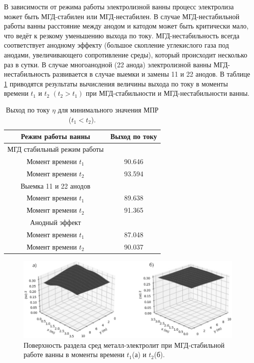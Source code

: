 \documentclass[]{pmi}
\begin{document}
В зависимости от режима работы электролизной ванны процесс электролиза может быть МГД-стабилен или МГД-нестабилен. В случае МГД-нестабильной работы ванны расстояние между анодом и катодом может быть критически мало, что ведёт к резкому уменьшению выхода по току. МГД-нестабильность всегда соответствует анодному эффекту (большое скопление углекислого газа под анодами, увеличивающего сопротивление среды), который происходит несколько раз в сутки. В случае многоанодной (22 анода) электролизной ванны МГД-нестабильность развивается в случае выемки и замены 11 и 22 анодов. В таблице \ref{table:vihPoToku} приводятся результаты вычисления величины выхода по току в моменты времени $t_1$ и $t_2$ $(t_2>t_1)$ при МГД-стабильности и МГД-нестабильности ванны. 

\begin{table}[H]
\centering
\begin{tabular}{|c|c|}
\hline
Режим работы ванны &Выход по току	\\
\hline
МГД стабильный режим работы &	\\
Момент времени $t_1$			&90.646	\\ 
Момент времени $t_2$		&93.594	\\  
\hline
Выемка 11 и 22 анодов &	\\
Момент времени $t_1$		&89.638	\\  
Момент времени $t_2$		&91.365	\\  
\hline
Анодный эффект &	\\
Момент времени $t_1$	&87.048	\\  
Момент времени $t_2$	&90.037	\\  
\hline
\end{tabular}
\caption{Выход по току $\eta$ для минимального значения МПР ($t_1 < t_2$). \label{table:vihPoToku}}
\end{table}

\begin{figure}[H]
    \centering
    \includegraphics[width=150mm]{спокойная поверхность.png}
    \caption{Поверхность раздела сред металл-электролит при МГД-стабильной работе ванны в моменты времени $t_1$(а) и $t_2$(б).}
    \label{fig:stab} 
\end{figure}
\end{document}

